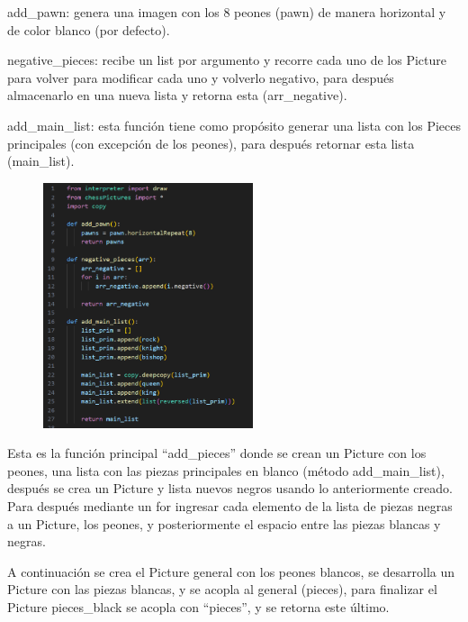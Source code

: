 \documentclass{article}
\begin{document}
	add\_pawn: genera una imagen con los 8 peones (pawn) de manera horizontal y de color blanco (por defecto).
	
	negative\_pieces: recibe un list por argumento y recorre cada uno de los Picture para volver para modificar cada uno y volverlo negativo, para después almacenarlo en una nueva lista y retorna esta (arr\_negative).
	
	add\_main\_list: esta función tiene como propósito generar una lista con los Pieces principales (con excepción de los peones), para después retornar	esta lista (main\_list).
	
	\begin{figure}[H]
		\centering
		\includegraphics[width=0.55\textwidth,keepaspectratio]{img/cap16_1.png}
	\end{figure}
	
	Esta es la función principal “add\_pieces” donde se crean un Picture con los peones, una lista con las piezas principales en blanco (método add\_main\_list), después se crea un Picture y lista nuevos negros usando lo anteriormente creado. Para después mediante un for ingresar cada elemento de la lista de piezas negras a un Picture, los peones, y posteriormente el espacio entre las piezas blancas y negras.
	
	A continuación se crea el Picture general con los peones blancos, se desarrolla un Picture con las piezas blancas, y se acopla al general (pieces), para finalizar el Picture pieces\_black se acopla con “pieces”, y se retorna este último.
	
\end{document}
